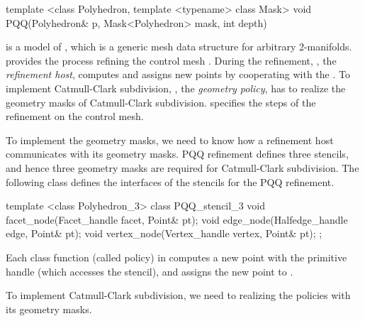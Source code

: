 \begin{ccExampleCode}
template <class Polyhedron, template <typename> class Mask>
void PQQ(Polyhedron& p, Mask<Polyhedron> mask, int depth)
\end{ccExampleCode}

 is a model of , which
is a generic mesh data structure for arbitrary 
2-manifolds.  provides the process refining 
the control mesh . During the refinement, 
, the \emph{refinement host}, computes and assigns
new points by cooperating with the . 
To implement Catmull-Clark subdivision,
, the \emph{geometry policy}, has to realize the 
geometry masks of Catmull-Clark subdivision. 
 specifies the steps of the refinement 
on the control mesh. 

To implement the geometry masks, we need to know how  
a refinement host communicates with its geometry masks. 
PQQ refinement defines three stencils, and hence 
three geometry masks are required for Catmull-Clark subdivision.
The following class defines the interfaces of the stencils 
for the PQQ refinement.

\begin{ccExampleCode}
template <class Polyhedron_3>
class PQQ_stencil_3 {
  void facet_node(Facet_handle facet, Point& pt);
  void edge_node(Halfedge_handle edge, Point& pt);
  void vertex_node(Vertex_handle vertex, Point& pt);
};
\end{ccExampleCode}

Each class function (called policy) in  
computes a new point with the primitive handle (which 
accesses the stencil), and 
assigns the new point to . 

To implement Catmull-Clark subdivision, we need to realizing the 
policies with its geometry masks. 

